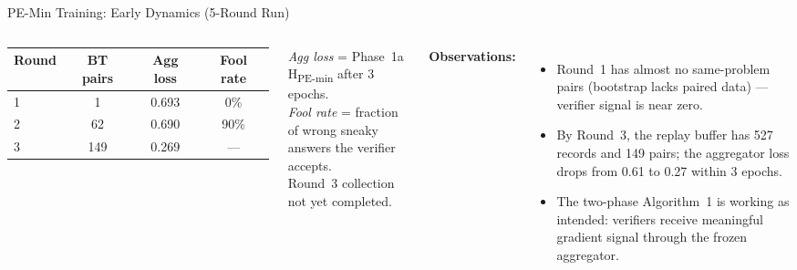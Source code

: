 \documentclass[aspectratio=169]{beamer}
\begin{document}
\begin{frame}{PE-Min Training: Early Dynamics (5-Round Run)}

  \begin{columns}
    \renewcommand{\arraystretch}{1.25}
    \begin{tabular}{lccc}
      \toprule
      \textbf{Round} & \textbf{BT pairs} & \textbf{Agg loss} & \textbf{Fool rate} \\
      \midrule
      1 & 1   & 0.693 & 0\%  \\
      2 & 62  & 0.690 & 90\% \\
      3 & 149 & 0.269 & ---  \\
      \bottomrule
    \end{tabular}

    \vspace{0.6em}
    \small
    \textit{Agg loss} = Phase~1a H\textsubscript{PE-min} after 3 epochs.\\
    \textit{Fool rate} = fraction of wrong sneaky answers the verifier accepts.\\
    Round~3 collection not yet completed.

    \textbf{Observations:}
    \begin{itemize}
      \item Round~1 has almost no same-problem pairs (bootstrap lacks paired
            data) --- verifier signal is near zero.
      \item By Round~3, the replay buffer has 527 records and 149 pairs;
            the aggregator loss drops from 0.61 to 0.27 within 3 epochs.
      \item The two-phase Algorithm~1 is working as intended: verifiers
            receive meaningful gradient signal through the frozen aggregator.
    \end{itemize}
  \end{columns}

\end{frame}
\end{document}
